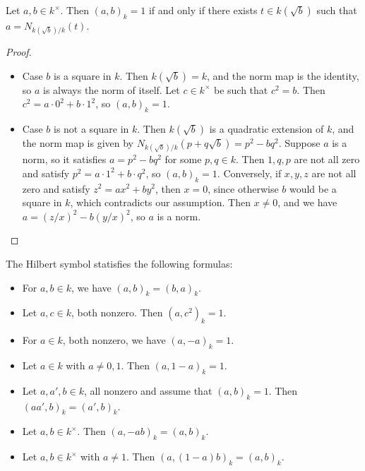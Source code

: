 \begin{lemma}
	\label{lem:eq_one_iff}
	\leanok
	Let $a, b \in k^\times$. Then $(a, b)_k = 1$ if and only if there exists $t \in k(\sqrt{b})$ such
	that $a = N_{k(\sqrt{b})/k}(t)$.
\end{lemma}

\begin{proof}
	\begin{itemize}
		\item Case $b$ is a square in $k$. Then $k(\sqrt{b}) = k$, and the norm map is the identity, so
		$a$ is always the norm of itself. Let $c \in k^\times$ be such that $c^2 = b$.
		Then $c^2 = a \cdot 0^2 + b \cdot 1^2$, so $(a,b)_k=1$.
		\item Case $b$ is not a square in $k$. Then $k(\sqrt{b})$ is a quadratic extension of $k$, and
		the norm map is given by $N_{k(\sqrt{b})/k}(p + q \sqrt{b}) = p^2 - b q^2$.
		Suppose $a$ is a norm, so it satisfies $a = p^2 - b q^2$ for some $p, q \in k$.
		Then $1, q, p$ are not all zero and satisfy $ p^2 = a \cdot 1^2 + b \cdot q^2$,
		so $(a, b)_k = 1$. Conversely, if $x, y, z$ are not all zero and satisfy $z^2 = ax^2 + by^2$,
		then $x=0$, since otherwise $b$ would be a square in $k$, which contradicts our assumption.
		Then $x \ne 0$, and we have $a = (z/x)^2 - b (y/x)^2$, so $a$ is a norm.
	\end{itemize}
\end{proof}

\begin{proposition}
	\label{prop:hilbert_symbol_properties}
	\leanok
	The Hilbert symbol statisfies the following formulas:
	\begin{itemize}
		\item For $a, b \in k$, we have $(a, b)_k = (b, a)_k$.
		\item Let $a, c \in k$, both nonzero. Then $(a, c^2)_k = 1$.
		\item For $a \in k$, both nonzero, we have $(a, -a)_k = 1$.
		\item Let $a \in k$ with $a \ne 0, 1$. Then $(a, 1 - a)_k = 1$.
		\item Let $a, a', b \in k$, all nonzero and assume that $(a, b)_k = 1$. Then $(a a', b)_k = (a', b)_k$.
		\item Let $a, b \in k^\times$. Then $(a, -ab)_k = (a, b)_k$.
		\item Let $a, b \in k^\times$ with $a \ne 1$. Then $(a, (1-a)b)_k = (a, b)_k$.
	\end{itemize}
\end{proposition}

